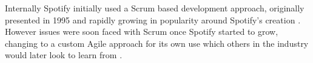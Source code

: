 \par
Internally Spotify initially used a Scrum based development approach, originally presented in 1995 \parencite[][118]{scrum_paper, spotify_eng_culture_1} and rapidly growing in popularity around Spotify's creation \parencite{scrumalliance_membership_2014}. However issues were soon faced with Scrum once Spotify started to grow, changing to a custom Agile approach for its own use which others in the industry would later look to learn from \parencite{spotify_eng_culture_1, spotify_eng_culture_2, spotify_agile_article, emulating_spotifys_matrix, scaling_agile_spotify_scrum, how_spotify_scales}.